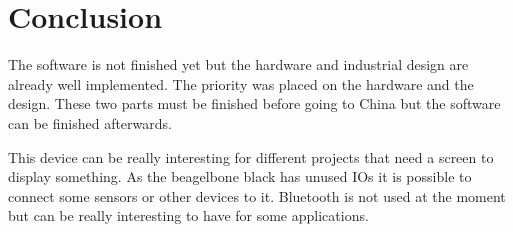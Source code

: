 \section{Conclusion}

The software is not finished yet but the hardware and industrial design are already well implemented. The priority was placed on the hardware and the design. These two parts must be finished before going to China but the software can be finished afterwards.

This device can be really interesting for different projects that need a screen to display something. As the beagelbone black has unused IOs it is possible to connect some sensors or other devices to it. Bluetooth is not used at the moment but can be really interesting to have for some applications.
